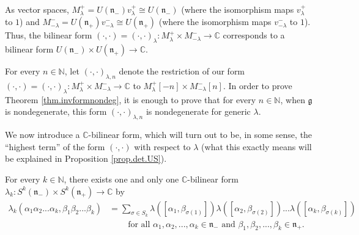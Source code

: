 \documentclass[etingof-lie.tex]{subfiles}
\begin{document}
As vector spaces, $M_{\lambda}^{+}=U\left(  \mathfrak{n}_{-}\right)
v_{\lambda}^{+}\cong U\left(  \mathfrak{n}_{-}\right)  $ (where the
isomorphism maps $v_{\lambda}^{+}$ to $1$) and $M_{-\lambda}^{-}=U\left(
\mathfrak{n}_{+}\right)  v_{-\lambda}^{-}\cong U\left(  \mathfrak{n}%
_{+}\right)  $ (where the isomorphism maps $v_{-\lambda}^{-}$ to $1$). Thus,
the bilinear form $\left(  \cdot,\cdot\right)  =\left(  \cdot,\cdot\right)
_{\lambda}:M_{\lambda}^{+}\times M_{-\lambda}^{-}\rightarrow\mathbb{C}$
corresponds to a bilinear form $U\left(  \mathfrak{n}_{-}\right)  \times
U\left(  \mathfrak{n}_{+}\right)  \rightarrow\mathbb{C}$.

For every $n\in\mathbb{N}$, let $\left(  \cdot,\cdot\right)  _{\lambda,n}$
denote the restriction of our form $\left(  \cdot,\cdot\right)  =\left(
\cdot,\cdot\right)  _{\lambda}:M_{\lambda}^{+}\times M_{-\lambda}%
^{-}\rightarrow\mathbb{C}$ to $M_{\lambda}^{+}\left[  -n\right]  \times
M_{-\lambda}^{-}\left[  n\right]  $. In order to prove Theorem
\ref{thm.invformnondeg}, it is enough to prove that for every $n\in\mathbb{N}%
$, when $\mathfrak{g}$ is nondegenerate, this form $\left(  \cdot
,\cdot\right)  _{\lambda,n}$ is nondegenerate for generic $\lambda$.

We now introduce a $\mathbb{C}$-bilinear form, which will turn out to be, in
some sense, the ``highest term'' of the form $\left(  \cdot,\cdot\right)  $
with respect to $\lambda$ (what this exactly means will be explained in
Proposition \ref{prop.det.US}).

\begin{proposition}
\label{prop.lambda_k}For every $k\in\mathbb{N}$, there exists one and only one
$\mathbb{C}$-bilinear form $\lambda_{k}:S^{k}\left(  \mathfrak{n}_{-}\right)
\times S^{k}\left(  \mathfrak{n}_{+}\right)  \rightarrow\mathbb{C}$ by
\begin{align}
\lambda_{k}\left(  \alpha_{1}\alpha_{2}...\alpha_{k},\beta_{1}\beta
_{2}...\beta_{k}\right)   &  =\sum\limits_{\sigma\in S_{k}}\lambda\left(
\left[  \alpha_{1},\beta_{\sigma\left(  1\right)  }\right]  \right)
\lambda\left(  \left[  \alpha_{2},\beta_{\sigma\left(  2\right)  }\right]
\right)  ...\lambda\left(  \left[  \alpha_{k},\beta_{\sigma\left(  k\right)
}\right]  \right) \nonumber\\
&  \ \ \ \ \ \ \ \ \ \ \text{for all }\alpha_{1},\alpha_{2},...,\alpha_{k}%
\in\mathfrak{n}_{-}\text{ and }\beta_{1},\beta_{2},...,\beta_{k}%
\in\mathfrak{n}_{+}. \label{thm.invformnondeg.pf.lambda}%
\end{align}

\end{proposition}
\end{document}
